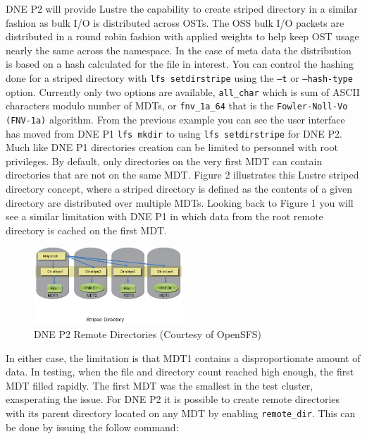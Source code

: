\documentclass[conference,compsoc]{IEEEtran}
\begin{document}
DNE P2 will provide Lustre the capability to create striped directory in a
similar fashion as bulk I/O is distributed across OSTs. The OSS bulk I/O
packets are distributed in a round robin fashion with applied weights to help
keep OST usage nearly the same across the namespace. In the case of meta data
the distribution is based on a hash calculated for the file in interest. You
can control the hashing done for a striped directory with
{\footnotesize{\texttt{lfs setdirstripe}}} using the
{\footnotesize{\texttt{–t}}} or {\footnotesize{\texttt{--hash-type}}} option.
Currently only two options are available, {\footnotesize{\texttt{all\_char}}}
which is sum of ASCII characters modulo number of MDTs, or
{\footnotesize{\texttt{fnv\_1a\_64}}} that is the
{\footnotesize{\texttt{Fowler-Noll-Vo (FNV-1a)}}} algorithm. From the previous
example you can see the user interface has moved from DNE P1
{\footnotesize{\texttt{lfs mkdir}}} to using {\footnotesize{\texttt{lfs
setdirstripe}}}  for DNE P2. Much like DNE P1 directories creation can be
limited to personnel with root privileges. By default, only directories on the
very first MDT can contain directories that are not on the same MDT. Figure 2
illustrates this Lustre striped directory concept, where a striped directory is
defined as the contents of a given directory are distributed over multiple
MDTs.  Looking back to Figure 1 you will see a similar limitation with DNE P1
in which data from the root remote directory is cached on the first MDT.  

\begin{figure}[!ht]
  \centering
    \includegraphics[width=0.5\textwidth]{figs/dnep2}
  \caption{DNE P2 Remote Directories (Courtesy of OpenSFS)}
\end{figure}

In either case, the limitation is that MDT1 contains a disproportionate
amount of data. In testing, when the file and directory count reached high 
enough, the first MDT filled rapidly. The first MDT was the smallest in the
test cluster, exasperating the issue.  For DNE P2 it is possible to
create remote directories with its parent directory located on any MDT
by enabling {\footnotesize{\texttt{remote\_dir}}}. This can be done by issuing the follow command:
\end{document}
